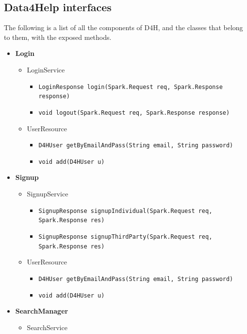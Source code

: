 \documentclass[a4paper, hidelinks, 12pt]{report}
\begin{document}
	\subsection{Data4Help interfaces}
	The following is a list of all the components of D4H, and the classes that belong to them, with the exposed methods.
	\begin{itemize}
		\item{\textbf{Login}}
			\begin{itemize}
				\item{LoginService}
					\begin{itemize}
						\item{\verb|LoginResponse login(Spark.Request req, Spark.Response response)|}
						\item{\verb|void logout(Spark.Request req, Spark.Response response)|}
					\end{itemize}
				\item{UserResource}
					\begin{itemize}
						\item{\verb|D4HUser getByEmailAndPass(String email, String password)|}
						\item{\verb|void add(D4HUser u)|}
					\end{itemize}
			\end{itemize}
			\item{\textbf{Signup}}
			\begin{itemize}
				\item{SignupService}
					\begin{itemize}
						\item{\verb|SignupResponse signupIndividual(Spark.Request req, Spark.Response res)|}
						\item{\verb|SignupResponse signupThirdParty(Spark.Request req, Spark.Response res)|}
					\end{itemize}
				\item{UserResource}
					\begin{itemize}
						\item{\verb|D4HUser getByEmailAndPass(String email, String password)|}
						\item{\verb|void add(D4HUser u)|}
					\end{itemize}
			\end{itemize}
			\item{\textbf{SearchManager}}
			\begin{itemize}
				\item{SearchService}
					\begin{itemize}

\end{itemize}
\end{itemize}
\end{itemize}
\end{document}
